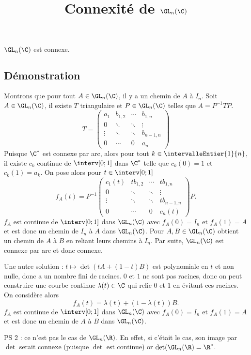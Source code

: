 \documentclass[fontsize=12pt,twoside=false,parskip=half,french]{scrartcl}
\title{Connexité de $\GL_n(\C)$}
\date{}
\author{}
\begin{document}
\maketitle
   \begin{Theoreme}[Connexité de $\GL_n(\C)$]
      $\GL_n(\C)$ est connexe.
   \end{Theoreme}
   \subsection{Démonstration}
      Montrons que pour tout $A \in \GL_n(\C)$, il y a un chemin de $A$ à $I_n$.
      Soit $A \in \GL_n(\C)$, il existe $T$ triangulaire et $P \in \GL_n(\C)$ 
      telles que $A = P^{-1}TP$.
      \[
        T = \begin{pmatrix}
           a_1      & b_{1, 2} & \cdots & b_{1, n}\\
           0        & \ddots   & \ddots & \vdots  \\
           \vdots   & \ddots   & \ddots & b_{n-1, n}\\
           0        & \cdots   &  0     &  a_n
        \end{pmatrix}
      \]
      Puisque $\C^*$ est connexe par arc, alors pour tout 
      $k \in  \intervalleEntier{1}{n}$, il existe $c_k$ continue de $\interv[0; 1]$
      dans $\C^*$ telle que $c_k(0) = 1$ et $c_k(1) = a_k$. On pose alors pour
      $t \in \interv[0; 1]$
       \[
        f_A(t) = P^{-1}\begin{pmatrix}
           c_1(t)      & tb_{1, 2} & \cdots & tb_{1, n}\\
           0        & \ddots   & \ddots & \vdots  \\
           \vdots   & \ddots   & \ddots & tb_{n-1, n}\\
           0        & \cdots   &  0     &  c_n(t)
        \end{pmatrix}P.
      \]
      $f_A$ est continue de $\interv[0; 1]$ dans $\GL_n(\C)$ avec $f_A(0) = I_n$ 
      et $f_A(1) = A$ et est donc un chemin de $I_n$ à $A$ dans $\GL_n(\C)$. 
      Pour $A, B \in \GL_n(\C)$ obtient un chemin de $A$ à $B$  en reliant leurs 
      chemins à $I_n$. Par suite, $\GL_n(\C)$ est connexe par arc et donc connexe.
     
      Une autre solution : $t \mapsto \det(tA + (1 - t)B)$ est polynomiale
      en $t$ et non nulle, donc a un nombre fini de racines. $0$ et $1$ ne sont pas
      racines, donc on peut construire une courbe continue $\lambda(t) \in \C$
      qui relie $0$ et $1$ en évitant ces racines. On considère alors
      \[  
         f_A(t) = \lambda(t) + (1 - \lambda(t))B.    
      \]
      $f_A$ est continue de $\interv[0; 1]$ dans $\GL_n(\C)$ avec $f_A(0) = I_n$ 
      et $f_A(1) = A$ et est donc un chemin de $A$ à $B$ dans $\GL_n(\C)$. 
      
      PS 2 : ce n'est pas le cas de $\GL_n(\R)$. En effet, si c'était le cas, 
      son image par $\det$ serait connexe (puisque $\det$ est continue) or
      $\det(\GL_n(\R) = \R^*$.  
\end{document}
